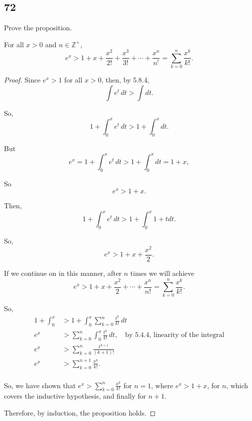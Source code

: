 \documentclass[../hw8]{subfiles}
\begin{document}
\subsection*{72}
Prove the proposition.

\begin{proposition}
    For all $x>0$ and $n\in\mathbb{Z}^+$,
    \[e^x>1+x+\frac{x^2}{2!}+\frac{x^3}{3!}+\cdots+\frac{x^n}{n^!}=\sum\limits_{k=0}^{n}\frac{x^k}{k!}.\]
\end{proposition}

\begin{proof}
    Since $e^x>1$ for all $x>0$, then, by 5.8.4, \[\int e^t\,dt > \int dt.\]

    So, \[1+\int_{0}^{x}e^t\,dt >1+\int_{0}^{x} dt.\]

    But \[e^x=1+\int_{0}^{x}e^t\,dt >1+\int_{0}^{x} dt=1+x,\]

    So \[e^x>1+x.\]

    Then, \[1+\int_{0}^{x}e^t\,dt >1+\int_{0}^{x} 1+t dt.\]

    So, \[e^x>1+x+\frac{x^2}{2}.\]

    If we continue on in this manner, after $n$ times we will achieve
    \[e^x>1+x+\frac{x^2}{2}+\cdots+\frac{x^n}{n!}=\sum\limits_{k=0}^{n}\frac{x^k}{k!}.\]

    So,
    \begin{align*}
        1+\int_{0}^{x}&>1+\int_{0}^{x}\sum\limits_{k=0}^{n}\frac{t^k}{k!}\,dt \\
        e^x&>\sum\limits_{k=0}^{n} \int_{0}^{x} \frac{t^k}{k!}\,dt, \quad \text{by 5.4.4, linearity of the integral} \\
        e^x&>\sum\limits_{k=0}^{n} \frac{t^{k+1}}{(k+1)!} \\
        e^x&>\sum\limits_{k=0}^{n+1}\frac{x^k}{k!}. \\
    \end{align*}

    So, we have shown that $e^x>\sum\limits_{k=0}^{n}\frac{x^k}{k!}$ for $n=1$, where $e^x>1+x$, for $n$, which covers the inductive hypothesis, and finally for $n+1$.

    Therefore, by induction, the proposition holds.






\end{proof}
\end{document}
